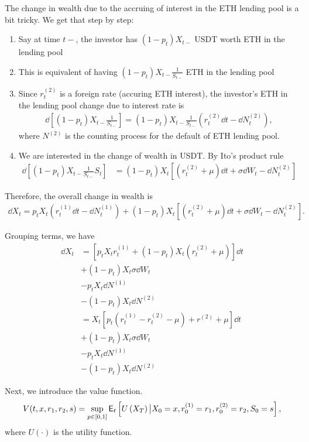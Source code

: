 \documentclass[square]{article} %
\theoremstyle{plain}
\theoremstyle{definition} %
\begin{document}
The change in wealth due to the accruing of interest in the ETH lending pool is a bit tricky. 
We get that step by step:
\begin{enumerate}
\item Say at time $t-$, the investor has $(1-p_t)X_{t-}$ USDT worth ETH in the lending pool
\item This is equivalent of having $(1-p_t)X_{t-}\frac{1}{S_{t-}}$ ETH in the lending pool
\item Since $r^{(2)}_t$ is a foreign rate (accuring ETH interest), the investor's ETH in the lending pool change due to interest rate is
\begin{align*}
  \dd \left[(1-p_t)X_{t-}\frac{1}{S_{t-}}\right] = (1-p_t)X_{t-}\frac{1}{S_{t-}} \left(r^{(2)}_t\dd t - \dd N^{(2)}_t\right),
\end{align*}
where $N^{(2)}$ is the counting process for the default of ETH lending pool.
\item We are interested in the change of wealth in USDT. By Ito's product rule
\begin{align*}
  \dd \left[(1-p_t)X_{t-}\frac{1}{S_{t-}}S_t\right]
  &= (1-p_t)X_t \left[
  (r^{(2)}_t + \mu) \dd t + \sigma \dd W_t - \dd N_t^{(2)}
  \right]
\end{align*}
\end{enumerate}

Therefore, the overall change in wealth is
\begin{align*}
\dd X_t = p_t X_t \left(r^{(1)}_t \dd t- \dd N^{(1)}_t\right)
+ (1-p_t)X_t\left[
(r^{(2)}_t+\mu)\dd t + \sigma \dd W_t - \dd N^{(2)}_t
\right].
\end{align*}

Grouping terms, we have
\begin{align*}
  \dd X_t &= \left[
  p_t X_t r^{(1)}_t + (1-p_t)X_t (r^{(2)}_t + \mu)
  \right]\dd t \\
  &+(1-p_t)X_t \sigma \dd W_t \\
  &-p_t X_t \dd N^{(1)}\\
  &-(1-p_t) X_t \dd N^{(2)}\\
  &= X_t\left[
  p_t  \left(
    r^{(1)}_t - r^{(2)}_t - \mu
    \right)
    + r^{(2)}+\mu
  \right]\dd t\\
  &+(1-p_t)X_t \sigma \dd W_t \\
  &-p_t X_t \dd N^{(1)}\\
  &-(1-p_t) X_t \dd N^{(2)}
  \end{align*}

Next, we introduce the value function. 
\begin{align*}
V(t, x, r_1, r_2, s) = \sup_{p \in [0,1]}\mathbb{\sf E}_t\left[
U\left(X_T\right) \big| X_0=x, r^{(1)}_0=r_1, r^{(2)}_0=r_2, S_0 = s
\right],
\end{align*}
where $U(\cdot)$ is the utility function. \\
\end{document}
